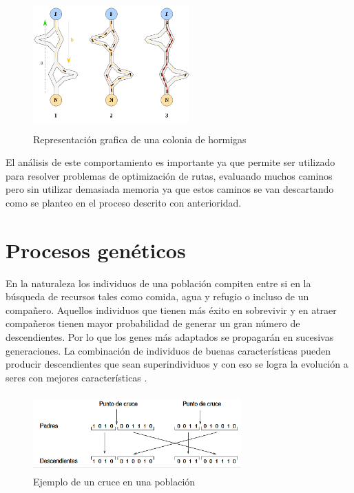 \documentclass[12pt, titlepage]{article}
\begin{document}
\begin{figure}[H]
    \begin{center}
        \includegraphics[width=6cm, height=5cm]{./img/ants.png}
        \caption{Representación grafica de una colonia de hormigas}
        \label{fig:ants}
    \end{center}
\end{figure}

El análisis de este comportamiento es importante ya que permite ser utilizado para resolver problemas de optimización de rutas, evaluando muchos caminos pero sin utilizar demasiada memoria ya que estos caminos se van descartando como se planteo en el proceso descrito con anterioridad.
\section{Procesos genéticos}
En la naturaleza los individuos de una población compiten entre si en la búsqueda de recursos tales como comida, agua y refugio o incluso de un compañero. Aquellos individuos que tienen más éxito en sobrevivir y en atraer compañeros tienen mayor probabilidad de generar un gran número de descendientes. Por lo que los genes más adaptados se propagarán en sucesivas generaciones. La combinación de individuos de buenas características pueden producir descendientes que sean superindividuos y con eso se logra la evolución a seres con mejores características \cite{GEN}.

\begin{figure}[H]
    \begin{center}
        \includegraphics[width=8cm, height=3cm]{./img/geneticos.png}
        \caption{Ejemplo de un cruce en una población}
        \label{fig:geneticos}
    \end{center}
\end{figure}
\end{document}
